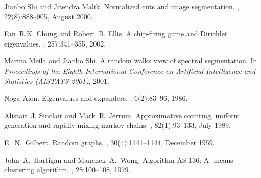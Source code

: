 \documentclass{article}
\begin{document}
\begin{thebibliography}{10}
Jianbo Shi and Jitendra Malik.
\newblock Normalized cuts and image segmentation.
,
  22(8):888--905, August 2000.

Fan~R.K. Chung and Robert~B. Ellis.
\newblock A chip-firing game and {D}irichlet eigenvalues.
, 257:341--355, 2002.

Marina Meila and Jianbo Shi.
\newblock A random walks view of spectral segmentation.
\newblock In {\em Proceedings of the Eighth International Conference on
  Artificial Intelligence and Statistics (AISTATS 2001)}, 2001.

Noga Alon.
\newblock Eigenvalues and expanders.
, 6(2):83--96, 1986.

Alistair~J. Sinclair and Mark~R. Jerrum.
\newblock Approximative counting, uniform generation and rapidly mixing markov
  chains.
, 82(1):93--133, July 1989.

E.~N.\ Gilbert.
\newblock Random graphs.
, 30(4):1141--1144, December
  1959.

John~A.\ Hartigan and Manchek~A.\ Wong.
\newblock Algorithm {AS} 136: A -means clustering algorithm.
, 28:100--108, 1979.

\end{thebibliography}
\end{document}
